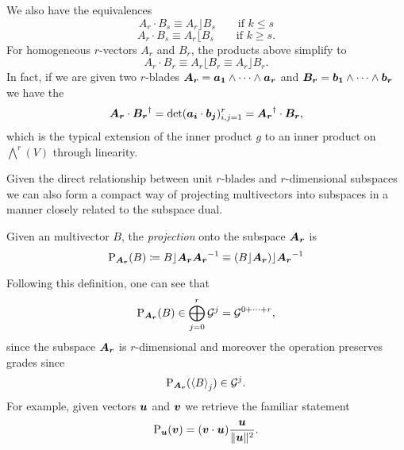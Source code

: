 We also have the equivalences
\begin{equation}
\label{eq:left_contraction_dot}
A_r \cdot B_s \equiv A_r \rfloor B_s \qquad \textrm{if $k\leq s$}
\end{equation}
\begin{equation}
\label{eq:right_contraction_dot}
A_r \cdot B_s \equiv A_r \lfloor B_s \qquad \textrm{if $k\geq s$}.
\end{equation}
For homogeneous $r$-vectors $A_r$ and $B_r$, the products above simplify to 
\begin{equation}
\label{dot_equivalent_contraction}
    A_r \cdot B_r \equiv A_r \lfloor B_r \equiv A_r \rfloor B_r.
\end{equation}
In fact, if we are given two $r$-blades $\blade{A_r} = \blade{a_1} \wedge \cdots \wedge \blade{a_r}$ and $\blade{B_r} = \blade{b_1} \wedge \cdots \wedge \blade{b_r}$ we have the 
\begin{equation}
\label{eq:dot_product}
\blade{A_r} \cdot \blade{B_r}^\dagger = \det(\blade{a_i} \cdot \blade{b_j} )_{i,j=1}^r = \blade{A_r}^\dagger \cdot \blade{B_r},
\end{equation}
which is the typical extension of the inner product $g$ to an inner product on $\bigwedge^r (V)$ through linearity.

Given the direct relationship between unit $r$-blades and $r$-dimensional subspaces we can also form a compact way of projecting multivectors into subspaces in a manner closely related to the subspace dual.  \begin{definition}
Given an multivector $B$, the \emph{projection} onto the subspace $\blade{A_r}$ is
\begin{equation}
\label{eq:projection}
\projection_{\blade{A_r}}(B) \coloneqq B\rfloor \blade{A_r} \blade{A_r}^{-1} \equiv (B\rfloor \blade{A_r})\rfloor \blade{A_r}^{-1}
\end{equation}
\end{definition}
Following this definition, one can see that
\begin{equation}
\projection_{\blade{A_r}}(B) \in \bigoplus_{j=0}^r \G^j = \G^{0+\cdots + r},
\end{equation}
since the subspace $\blade{A_r}$ is $r$-dimensional and moreover the operation preserves grades since
\begin{equation}
\projection_{\blade{A_r}}(\proj{j}{B}) \in \G^j.
\end{equation}
For example, given vectors $\blade{u}$ and $\blade{v}$ we retrieve the familiar statement 
\begin{equation}
\projection_{\blade{u}} (\blade{v}) = (\blade{v} \cdot \blade{u}) \frac{\blade{u}}{\|\blade{u}\|^2}.
\end{equation}

